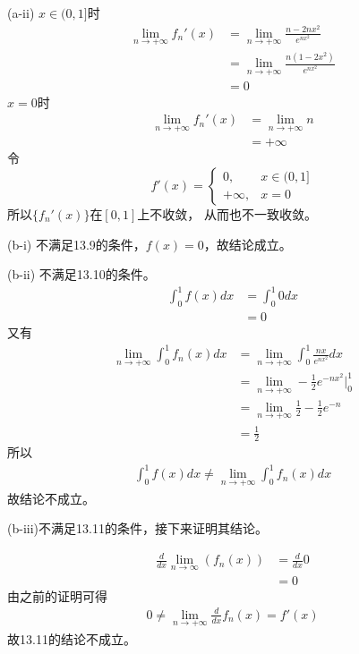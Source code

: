 \documentclass{article}
\begin{document}
\begin{itemize}
        (a-ii)
        $x \in (0, 1]$时
        \begin{align*}
          \lim\limits_{n \to +\infty} f_n'(x)
           & = \lim\limits_{n \to +\infty} \frac{n - 2nx^2}{e^{nx^2}}   \\
           & = \lim\limits_{n \to +\infty} \frac{n(1 - 2x^2)}{e^{nx^2}} \\
           & = 0
        \end{align*}
        $x = 0$时
        \begin{align*}
          \lim\limits_{n \to +\infty} f_n'(x)
           & = \lim\limits_{n \to +\infty} n \\
           & = +\infty
        \end{align*}
        令
        \begin{equation*}
          f'(x) = \begin{cases}
            0,       & x \in (0, 1] \\
            +\infty, & x = 0
          \end{cases}
        \end{equation*}
        所以$\{f_n'(x)\}$在$[0, 1]$上不收敛，
        从而也不一致收敛。

        (b-i) 不满足13.9的条件，$f(x) = 0$，故结论成立。

        (b-ii) 不满足13.10的条件。
        \begin{align*}
          \int_{0}^{1} f(x) dx
           & = \int_{0}^{1} 0 dx \\
           & = 0
        \end{align*}
        又有
        \begin{align*}
          \lim\limits_{n \to +\infty} \int_{0}^{1} f_n(x) dx
           & = \lim\limits_{n \to +\infty} \int_{0}^{1} \frac{nx}{e^{nx^2}} dx  \\
           & = \lim\limits_{n \to +\infty} - \frac{1}{2}e^{-nx^2}\bigg|_{0}^{1} \\
           & = \lim\limits_{n \to +\infty} \frac{1}{2} - \frac{1}{2}e^{-n}      \\
           & = \frac{1}{2}
        \end{align*}
        所以
        \begin{align*}
          \int_{0}^{1} f(x) dx \neq \lim\limits_{n \to +\infty} \int_{0}^{1} f_n(x) dx
        \end{align*}
        故结论不成立。

        (b-iii)不满足13.11的条件，接下来证明其结论。

        \begin{align*}
          \frac{d}{dx} \lim\limits_{n \to \infty}\left(f_n(x)\right)
           & = \frac{d}{dx} 0 \\
           & = 0
        \end{align*}
        由之前的证明可得
        \begin{align*}
          0 \neq \lim\limits_{n \to +\infty} \frac{d}{dx} f_n(x) = f'(x)
        \end{align*}
        故13.11的结论不成立。
\end{itemize}
\end{document}
